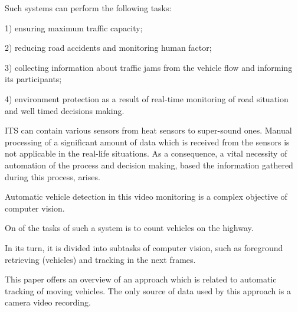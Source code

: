 \documentclass[12pt,a4paper,oneside,titlepage]{article}
\begin{document}
Such systems can perform the following tasks:

1) ensuring maximum traffic capacity;

2) reducing road accidents and monitoring human factor;

3) collecting information about traffic jams from the vehicle flow and informing its participants;

4) environment protection as a result of real-time monitoring of road situation and well timed decisions making.

ITS can contain various sensors from heat sensors to super-sound ones.
Manual processing of a significant amount of data which is received from the sensors is not applicable in the real-life situations.
As a consequence, a vital necessity of automation of the process and decision making, based the information gathered during this process, arises.

Automatic vehicle detection in this video monitoring is a complex objective of computer vision.

On of the tasks of such a system is to count vehicles on the highway.

In its turn, it is divided into subtasks of computer vision, such as foreground retrieving (vehicles) and tracking in the next frames.

This paper offers an overview of an approach which is related to automatic tracking of moving vehicles.
The only source of data used by this approach is a camera video recording.
\end{document}
